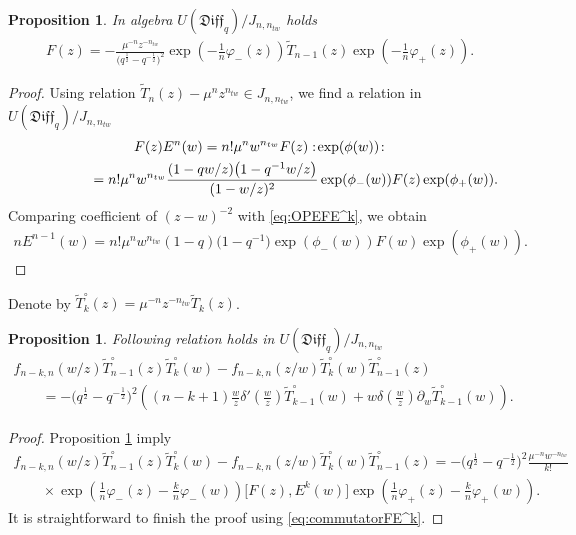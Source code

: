 \documentclass[pdftex]{sigma}
\numberwithin{equation}{section}
\newtheorem{Proposition}[Theorem]{Proposition}
\theoremstyle{definition}
\newcommand{\half}{\frac{1}{2}}
\newcommand{\qD}{\mathfrak{Diff}_q}
\newcommand{\T}{\tilde{T}}
\begin{document}
\begin{Proposition} \label{prop:F=Tn-1}
In algebra $U(\qD)/J_{n,n_{tw}}$ holds
\begin{gather*}
F(z) = - \frac{\mu^{-n} z^{-n_{tw}}}{\big(q^{\half}-q^{-\half}\big)^2 } \exp \left( -\frac{1}{n} \varphi_-(z) \right) \T_{n-1} (z) \exp \left( - \frac{1}{n} \varphi_+(z) \right).
\end{gather*}
\end{Proposition}

\begin{proof}
Using relation $\T_n(z) - \mu^n z^{n_{tw}} \in J_{n, n_{tw}}$, we find a relation in $U(\qD)/J_{n,n_{tw}}$
\begin{gather*} F(z) E^n(w) = n! \mu^n w^{n_{tw}} F(z) :\! \exp(\phi(w))\!: \\
\hphantom{F(z) E^n(w)}{} =n! \mu^n w^{n_{tw}} \frac{(1-qw/z)\big(1-q^{-1}w/z\big)}{(1 - w/z)^2} \exp(\phi_- (w)) F(z) \exp(\phi_+ (w)).
\end{gather*}
Comparing coefficient of $(z-w)^{-2}$ with \eqref{eq:OPEFE^k}, we obtain
\begin{gather*}
n E^{n-1} (w) = n! \mu^n w^{n_{tw}} (1-q)\big(1-q^{-1}\big) \exp(\phi_-(w)) F(w) \exp( \phi_+(w) ).\tag*{\qed}
\end{gather*}\renewcommand{\qed}{}
\end{proof}

Denote by $\T^{\circ}_k (z)= \mu^{-n} z^{-n_{tw}} \T_k(z)$.

\begin{Proposition} \label{prop:Wn-1}
Following relation holds in $U(\qD)/J_{n,n_{tw}}$
\begin{gather*}
f_{n-k,n} (w/z) \T^{\circ}_{n-1}(z) \T^{\circ}_k (w) - f_{n-k,n}(z/w) \T^{\circ}_k(w) \T^{\circ}_{n-1} (z) \\
\qquad{}= -\big(q^{\half}-q^{-\half}\big)^2 \left( (n-k+1) \frac{w}{z} \delta' \left(\frac{w}{z}\right) \T^{\circ}_{k-1} (w) + w \delta\left(\frac{w}{z}\right) \partial_w \T^{\circ}_{k-1} (w) \right).
\end{gather*}
\end{Proposition}

\begin{proof}
Proposition \ref{prop:F=Tn-1} imply
\begin{gather*}
f_{n-k,n} (w/z) \T^{\circ}_{n-1}(z) \T^{\circ}_k (w)- f_{n-k,n}(z/w) \T^{\circ}_k(w) \T^{\circ}_{n-1} (z)
= -\big(q^{\half}-q^{-\half}\big)^2 \frac{\mu^{-n} w^{-n_{tw}}}{k!} \\
\qquad{}\times \exp \left(\frac{1}{n}\varphi_-(z) - \frac{k}{n} \varphi_-(w) \right)\big[F(z), E^k(w)\big] \exp \left(\frac{1}{n}\varphi_+(z) - \frac{k}{n} \varphi_+(w) \right).
\end{gather*}
It is straightforward to finish the proof using \eqref{eq:commutatorFE^k}.
\end{proof}
\end{document}
